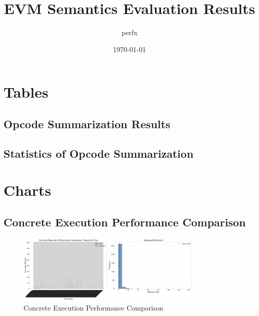 \documentclass[article]{article}
\title{EVM Semantics Evaluation Results}
\author{perfx}
\date{\today}
\begin{document}
\maketitle

\tableofcontents
\newpage

\section{Tables}

\subsection{Opcode Summarization Results}\label{tab:step3_opcode_list}



\newpage

\subsection{Statistics of Opcode Summarization}\label{tab:step3_category_statistics}



\newpage

\section{Charts}

\subsection{Concrete Execution Performance Comparison}\label{fig:concrete_performance_comparison}

\begin{figure}[H]
\centering
\includegraphics[width=0.8\textwidth]{charts/concrete_performance_comparison.pdf}
\caption{Concrete Execution Performance Comparison}
\label{fig:concrete_performance_comparison}
\end{figure}

\newpage
\end{document}
